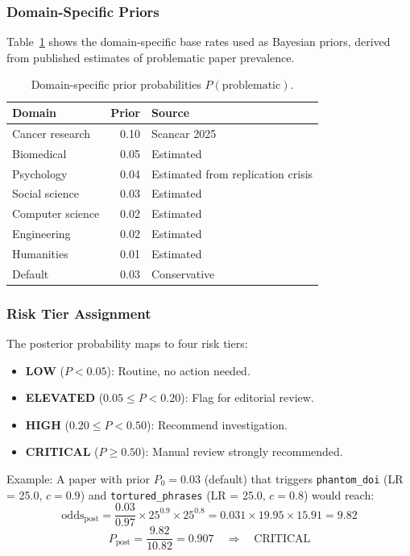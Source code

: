 \documentclass[sigconf,nonacm]{acmart}
\begin{document}
\subsubsection{Domain-Specific Priors}

Table~\ref{tab:priors} shows the domain-specific base rates used as Bayesian priors, derived from published estimates of problematic paper prevalence.

\begin{table}[t]
\caption{Domain-specific prior probabilities $P(\text{problematic})$.}
\label{tab:priors}
\centering
\small
\begin{tabular}{lrl}
\toprule
\textbf{Domain} & \textbf{Prior} & \textbf{Source} \\
\midrule
Cancer research  & 0.10 & Scancar 2025 \cite{scancar2025} \\
Biomedical       & 0.05 & Estimated \\
Psychology       & 0.04 & Estimated from replication crisis \\
Social science   & 0.03 & Estimated \\
Computer science & 0.02 & Estimated \\
Engineering      & 0.02 & Estimated \\
Humanities       & 0.01 & Estimated \\
Default          & 0.03 & Conservative \\
\bottomrule
\end{tabular}
\end{table}

\subsubsection{Risk Tier Assignment}

The posterior probability maps to four risk tiers:
\begin{itemize}[leftmargin=*]
    \item \textbf{LOW} ($P < 0.05$): Routine, no action needed.
    \item \textbf{ELEVATED} ($0.05 \leq P < 0.20$): Flag for editorial review.
    \item \textbf{HIGH} ($0.20 \leq P < 0.50$): Recommend investigation.
    \item \textbf{CRITICAL} ($P \geq 0.50$): Manual review strongly recommended.
\end{itemize}

\noindent Example: A paper with prior $P_0 = 0.03$ (default) that triggers \texttt{phantom\_doi} (LR = 25.0, $c = 0.9$) and \texttt{tortured\_phrases} (LR = 25.0, $c = 0.8$) would reach:
\[
\text{odds}_\text{post} = \frac{0.03}{0.97} \times 25^{0.9} \times 25^{0.8} = 0.031 \times 19.95 \times 15.91 = 9.82
\]
\[
P_\text{post} = \frac{9.82}{10.82} = 0.907 \quad \Rightarrow \quad \text{CRITICAL}
\]
\end{document}
